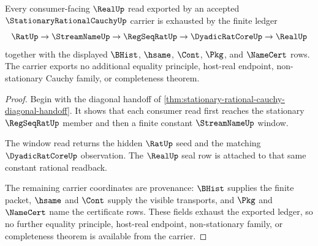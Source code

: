 \begin{theorem}
\label{thm:stationary-rational-cauchy-ledger-exactness}
Every consumer-facing $\RealUp$ read exported by an accepted $\StationaryRationalCauchyUp$ carrier is exhausted by the finite ledger
$$
\RatUp \to \StreamNameUp \to \RegSeqRatUp \to \DyadicRatCoreUp \to \RealUp
$$
together with the displayed $\BHist$, $\hsame$, $\Cont$, $\Pkg$, and $\NameCert$ rows. The carrier exports no additional equality principle, host-real endpoint, non-stationary Cauchy family, or completeness theorem.
\end{theorem}
\begin{proof}
Begin with the diagonal handoff of \autoref{thm:stationary-rational-cauchy-diagonal-handoff}. It shows that each consumer read first reaches the stationary $\RegSeqRatUp$ member and then a finite constant $\StreamNameUp$ window.

The window read returns the hidden $\RatUp$ seed and the matching $\DyadicRatCoreUp$ observation. The $\RealUp$ seal row is attached to that same constant rational readback.

The remaining carrier coordinates are provenance: $\BHist$ supplies the finite packet, $\hsame$ and $\Cont$ supply the visible transports, and $\Pkg$ and $\NameCert$ name the certificate rows. These fields exhaust the exported ledger, so no further equality principle, host-real endpoint, non-stationary family, or completeness theorem is available from the carrier.
\end{proof}

